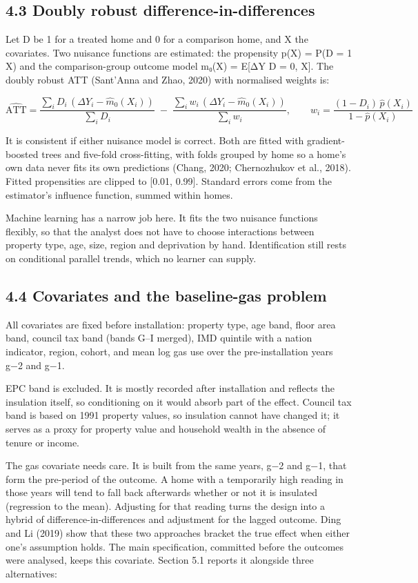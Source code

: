 \documentclass[11pt,a4paper]{article}
\begin{document}
\subsection*{4.3 Doubly robust difference-in-differences}

Let D be 1 for a treated home and 0 for a comparison home, and X the covariates. Two nuisance functions are estimated: the propensity p(X) = P(D = 1 \textbar{} X) and the comparison-group outcome model m₀(X) = E{[}ΔY \textbar{} D = 0, X{]}. The doubly robust ATT (Sant'Anna and Zhao, 2020) with normalised weights is:

\[
\widehat{\mathrm{ATT}} = \frac{\sum_i D_i\,(\Delta Y_i - \hat m_0(X_i))}{\sum_i D_i} \;-\; \frac{\sum_i w_i\,(\Delta Y_i - \hat m_0(X_i))}{\sum_i w_i}, \qquad w_i = \frac{(1-D_i)\,\hat p(X_i)}{1-\hat p(X_i)}
\]

It is consistent if either nuisance model is correct. Both are fitted with gradient-boosted trees and five-fold cross-fitting, with folds grouped by home so a home's own data never fits its own predictions (Chang, 2020; Chernozhukov et al., 2018). Fitted propensities are clipped to {[}0.01, 0.99{]}. Standard errors come from the estimator's influence function, summed within homes.

Machine learning has a narrow job here. It fits the two nuisance functions flexibly, so that the analyst does not have to choose interactions between property type, age, size, region and deprivation by hand. Identification still rests on conditional parallel trends, which no learner can supply.

\subsection*{4.4 Covariates and the baseline-gas problem}

All covariates are fixed before installation: property type, age band, floor area band, council tax band (bands G--I merged), IMD quintile with a nation indicator, region, cohort, and mean log gas use over the pre-installation years g−2 and g−1.

EPC band is excluded. It is mostly recorded after installation and reflects the insulation itself, so conditioning on it would absorb part of the effect. Council tax band is based on 1991 property values, so insulation cannot have changed it; it serves as a proxy for property value and household wealth in the absence of tenure or income.

The gas covariate needs care. It is built from the same years, g−2 and g−1, that form the pre-period of the outcome. A home with a temporarily high reading in those years will tend to fall back afterwards whether or not it is insulated (regression to the mean). Adjusting for that reading turns the design into a hybrid of difference-in-differences and adjustment for the lagged outcome. Ding and Li (2019) show that these two approaches bracket the true effect when either one's assumption holds. The main specification, committed before the outcomes were analysed, keeps this covariate. Section 5.1 reports it alongside three alternatives:
\end{document}

